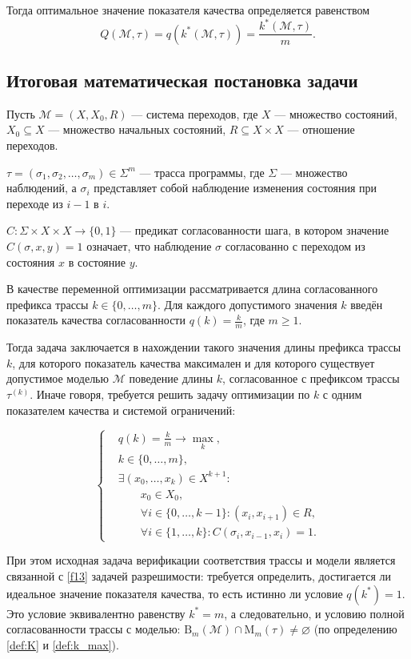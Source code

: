 Тогда оптимальное значение показателя качества определяется равенством
\begin{equation}\label{f12}
Q(\mathcal{M},\tau)
=
q\!\left(k^*(\mathcal{M},\tau)\right)
=
\frac{k^*(\mathcal{M},\tau)}{m}.
\end{equation}

\newpage
\subsection{Итоговая математическая постановка задачи}

Пусть $\mathcal{M} = (X, X_0, R)$
--- система переходов, где $X$ --- множество состояний,
$X_0 \subseteq X$ --- множество начальных состояний,
$R \subseteq X \times X$ --- отношение переходов.

$\tau = (\sigma_1,\sigma_2,\dots,\sigma_m) \in \Sigma^m$ --- трасса
программы, где $\Sigma$ --- множество наблюдений, а $\sigma_i$ представляет
собой наблюдение изменения состояния при переходе из $i-1$ в $i$.

$C : \Sigma \times X \times X \to \{0,1\}$ --- предикат согласованности
шага, в котором значение $C(\sigma,x,y)=1$ означает, что наблюдение $\sigma$
согласованно с переходом из состояния $x$ в состояние $y$.

В качестве переменной оптимизации рассматривается длина согласованного префикса
трассы $k \in \{0,\dots,m\}$. Для каждого допустимого значения $k$ введён
показатель качества согласованности $q(k)=\frac{k}{m}$, где $m \ge 1$.

Тогда задача заключается в нахождении такого значения длины префикса трассы
$k$, для которого показатель качества максимален и для которого существует
допустимое моделью $\mathcal{M}$ поведение длины $k$, согласованное с префиксом
трассы $\tau^{(k)}$. Иначе говоря, требуется решить задачу оптимизации по $k$ с
одним показателем качества и системой ограничений:

\begin{equation}\label{f13}
\left\{
\begin{aligned}
&q(k) = \frac{k}{m} \to \max\limits_{k},\\
&k \in \{0,\dots,m\},\\
&\exists (x_0,\dots,x_k) \in X^{k+1} : \\
&\quad\quad x_0 \in X_0, \\
&\quad\quad \forall i \in \{0,\dots,k-1\} : (x_i,x_{i+1}) \in R,\\
&\quad\quad\forall i \in \{1,\dots,k\} : C(\sigma_i,x_{i-1},x_i)=1.
\end{aligned}
\right.
\end{equation}

При этом исходная задача верификации соответствия трассы и модели является
связанной с \eqref{f13} задачей разрешимости: требуется определить, достигается
ли идеальное значение показателя качества, то есть истинно ли условие $q(k^*) =
1$. Это условие эквивалентно равенству $k^* = m$, а следовательно, и условию
полной согласованности трассы с моделью: $\mathrm{B}_m(\mathcal{M}) \cap
\mathrm{M}_m(\tau) \neq \varnothing$ (по определению \ref{def:K} и
\ref{def:k_max}).
